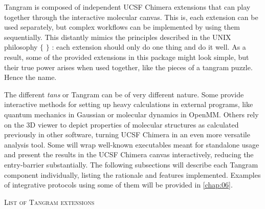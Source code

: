 Tangram is composed of independent UCSF Chimera extensions that can play together through the interactive molecular canvas. This is, each extension can be used separately, but complex workflows can be implemented by using them sequentially. This distantly mimics the principles described in the UNIX philosophy $ \{ $ $ \} $ : each extension should only do one thing and do it well. As a result, some of the provided extensions in this package might look simple, but their true power arises when used together, like the pieces of a tangram puzzle. Hence the name.

The different \textit{tans} or Tangram can be of very different nature. Some provide interactive methods for setting up heavy calculations in external programs, like quantum mechanics in Gaussian or molecular dynamics in OpenMM. Others rely on the 3D viewer to depict properties of molecular structures as calculated previously in other software, turning UCSF Chimera in an even more versatile analysis tool. Some will wrap well-known executables meant for standalone usage and present the results in the UCSF Chimera canvas interactively, reducing the entry-barrier substantially. The following subsections will describe each Tangram component individually, listing the rationale and features implemented. Examples of integrative protocols using some of them will be provided in \autoref{chap:06}.

\textsc{List of Tangram extensions}

